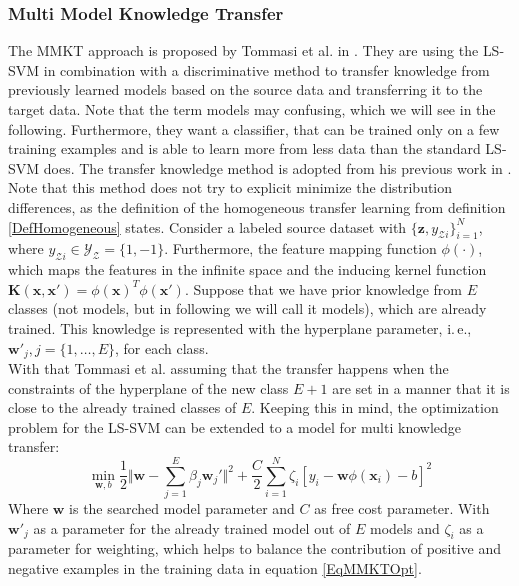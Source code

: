 \subsubsection{Multi Model Knowledge Transfer}
The \acs{MMKT} approach is proposed by Tommasi et al. in \cite{Tommasi.}.
They are using the \ac{LS-SVM} in combination with a discriminative method to transfer knowledge from previously learned models based on the source data and transferring it to the target data.
Note that the term models may confusing, which we will see in the following.
Furthermore, they want a classifier, that can be trained only on a few training examples and is able to learn more from less data than the standard \acs{LS-SVM} does.
The transfer knowledge method is adopted from his previous work in \cite{Tommasi.2009}.\\
Note that this method does not try to explicit minimize the distribution differences, as the definition of the homogeneous transfer learning from definition \ref{DefHomogeneous} states.
Consider a labeled source dataset with $\{\mathbf{z},y_{\mathcal{Z}i}\}_{i=1}^{N}$, where $y_{\mathcal{Z}i} \in \mathcal{Y_Z} =\{1,-1\}$.
Furthermore, the feature mapping function $\phi(\cdot)$, which maps the features in the infinite space and the inducing kernel function $\mathbf{K}(\mathbf{x},\mathbf{x}')=\phi(\mathbf{x})^T\phi(\mathbf{x}')$.
Suppose that we have prior knowledge from $E$ classes (not models, but in following we will call it models), which are already trained.
This knowledge is represented with the hyperplane parameter, i.\,e., $\mathbf{w}'_j, j = \{1,\dots,E\}$, for each class.\cite{Tommasi.}\\
With that Tommasi et al. assuming that the transfer happens when the constraints of the hyperplane of the new class $E+1$ are set in a manner that it is close to the already trained classes of $E$.
Keeping this in mind, the optimization problem for the \acs{LS-SVM} can be extended to a model for multi knowledge transfer:\cite{Tommasi.}
\begin{equation}\label{EqMMKTOpt}
		\min_{\mathbf{w},b} \frac{1}{2}\Vert\mathbf{w}-\sum_{j=1}^{E}\beta_j\mathbf{w}_j'\Vert^2 + \frac{C}{2}\sum_{i=1}^{N}\zeta_i[y_i-\mathbf{w}\phi(\mathbf{x}_i)-b]^2
\end{equation}
Where $\mathbf{w}$ is the searched model parameter and $C$ as free cost parameter. With $\mathbf{w}'_j$ as a parameter for the already trained model out of $E$ models and $\zeta_i$ as a parameter for weighting, which helps to balance the contribution of positive and negative examples in the training data in equation \eqref{EqMMKTOpt}.
